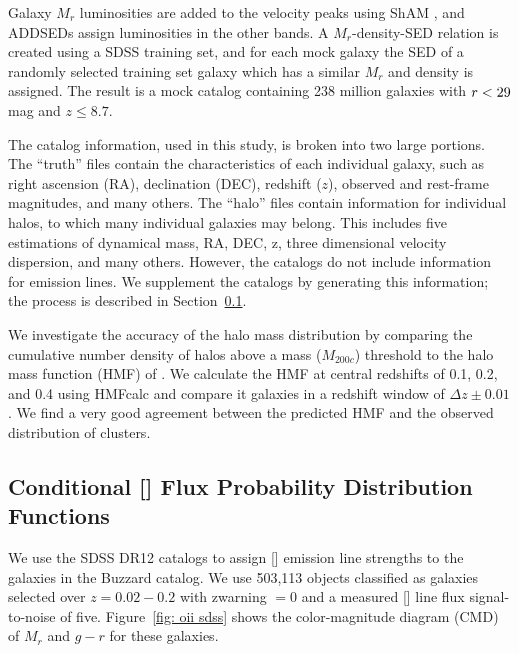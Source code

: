 Galaxy $M_r$ luminosities are added to the velocity peaks using ShAM \citep{Reddick2013}, and ADDSEDs assign luminosities in the other bands. A $M_r$-density-SED relation is created using a SDSS training set, and for each mock galaxy the SED of a randomly selected training set galaxy which has a similar $M_r$ and density is assigned. The result is a mock catalog containing 238 million galaxies with $\hbox{$r$} < 29$ mag and $z \leq 8.7$.

The catalog information, used in this study, is broken into two large portions. The ``truth'' files contain the characteristics of each individual galaxy, such as right ascension (RA), declination (DEC), redshift ($z$), observed and rest-frame magnitudes, and many others. The ``halo'' files contain information for individual halos, to which many individual galaxies may belong. This includes five estimations of dynamical mass, RA, DEC, z, three dimensional velocity dispersion, and many others. However, the catalogs do not include information for emission lines. We supplement the catalogs by generating this information; the process is described in Section~\ref{sec: oii luminosity}.


We investigate the accuracy of the halo mass distribution by comparing the cumulative number density of halos above a mass ($M_{200c}$) threshold to the halo mass function (HMF) of \cite{Tinker2008}. We calculate the HMF at central redshifts of 0.1, 0.2, and 0.4 using {\sc HMFcalc} \citep{Murray2013} and compare it galaxies in a redshift window of $\Delta z\pm0.01$. We find a very good agreement between the predicted HMF and the observed distribution of clusters.

\subsection{Conditional \hbox{[]} Flux Probability Distribution Functions}\label{sec: oii luminosity}
We use the SDSS DR12 \citep{Alam2015} catalogs to assign \hbox{[]} emission line strengths to the galaxies in the Buzzard catalog. We use 503,113 objects classified as galaxies selected over $z = 0.02 - 0.2$ with {\sc zwarning $=0$} and a measured \hbox{[]} line flux signal-to-noise of five. Figure~\ref{fig: oii sdss} shows the color-magnitude diagram (CMD) of $M_r$ and $g-r$ for these galaxies.

